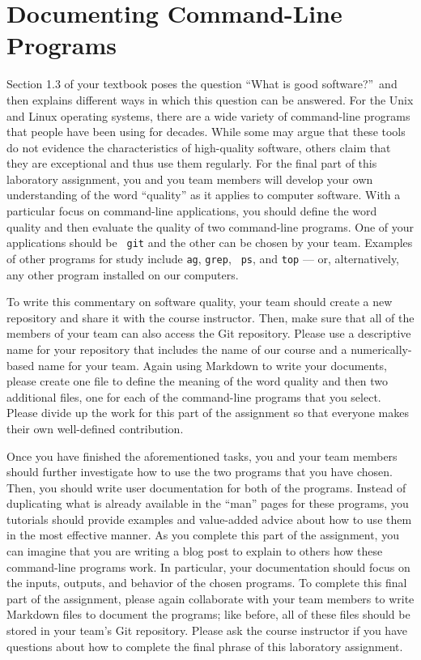 \section*{Documenting Command-Line Programs}

Section 1.3 of your textbook poses the question ``What is good software?''\ and then explains different ways in which
this question can be answered. For the Unix and Linux operating systems, there are a wide variety of command-line
programs that people have been using for decades. While some may argue that these tools do not evidence the
characteristics of high-quality software, others claim that they are exceptional and thus use them regularly. For the
final part of this laboratory assignment, you and you team members will develop your own understanding of the word
``quality'' as it applies to computer software. With a particular focus on command-line applications, you should define
the word quality and then evaluate the quality of two command-line programs. One of your applications should be {\tt
git} and the other can be chosen by your team. Examples of other programs for study include {\tt ag}, {\tt grep}, {\tt
ps}, and {\tt top} --- or, alternatively, any other program installed on our computers.

To write this commentary on software quality, your team should create a new repository and share it with the course
instructor. Then, make sure that all of the members of your team can also access the Git repository. Please use a
descriptive name for your repository that includes the name of our course and a numerically-based name for your team.
Again using Markdown to write your documents, please create one file to define the meaning of the word quality and then
two additional files, one for each of the command-line programs that you select. Please divide up the work for this part
of the assignment so that everyone makes their own well-defined contribution.

Once you have finished the aforementioned tasks, you and your team members should further investigate how to use the two
programs that you have chosen. Then, you should write user documentation for both of the programs. Instead of
duplicating what is already available in the ``man'' pages for these programs, you tutorials should provide examples and
value-added advice about how to use them in the most effective manner. As you complete this part of the assignment, you
can imagine that you are writing a blog post to explain to others how these command-line programs work. In particular,
your documentation should focus on the inputs, outputs, and behavior of the chosen programs. To complete this final part
of the assignment, please again collaborate with your team members to write Markdown files to document the programs;
like before, all of these files should be stored in your team's Git repository. Please ask the course instructor if you
have questions about how to complete the final phrase of this laboratory assignment.

